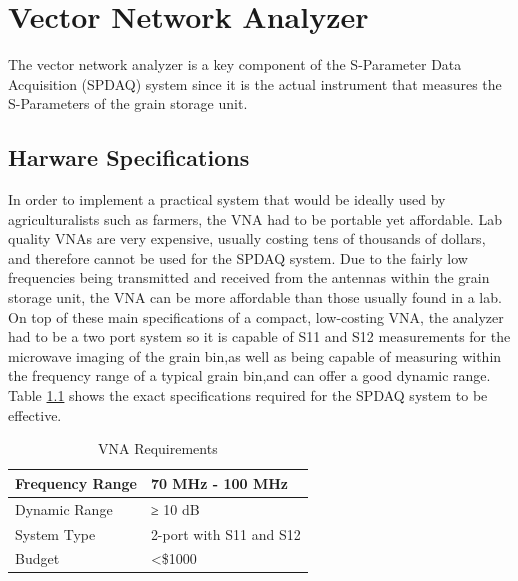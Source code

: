 %
\chapter{Vector Network Analyzer}
\label{sec:VNA}

The vector network analyzer is a key component of the S-Parameter Data Acquisition (SPDAQ) system since it is the actual
instrument that measures the S-Parameters of the grain storage unit.

\section{Harware Specifications}

In order to implement a practical system that would be ideally used by agriculturalists such as farmers, the VNA had to be
portable yet affordable. Lab quality VNAs are very expensive, usually costing tens of thousands of dollars, and therefore
cannot be used for the SPDAQ system. Due to the fairly low frequencies being transmitted and received from the antennas
within the grain storage unit, the VNA can be more affordable than those usually found in a lab.  On top of these main
specifications of a compact, low-costing VNA, the analyzer had to be a two port system so it is capable of S11 and S12
measurements for the microwave imaging of the grain bin,as well as being capable of measuring within the frequency range of a typical grain bin,and can offer a good dynamic range.  Table \ref{table:vna} shows the exact specifications required for the SPDAQ system to be effective.
\clearpage{}
\begin{table}[!h]
\centering
\caption{VNA Requirements \cite{vnaspecs}}
\label{table:vna}
\begin{tabular}{|l|l|}
\hline
Frequency Range & 70 MHz - 100 MHz 			\\ \hline
Dynamic Range   & ≥ 10 dB          			\\ \hline
System Type     & 2-port with S11 and S12 	\\ \hline
Budget   		& \textless \$1000		\\ \hline
\end{tabular}
\end{table}

